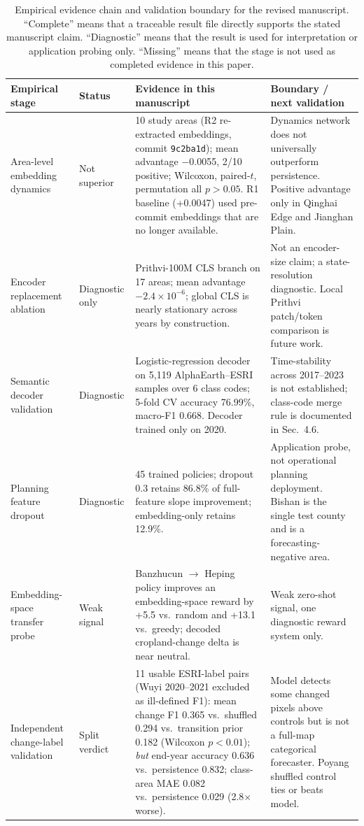 \documentclass{article}
\begin{document}
\begin{table}[htbp]
\centering
\caption{Empirical evidence chain and validation boundary for the revised manuscript. ``Complete'' means that a traceable result file directly supports the stated manuscript claim. ``Diagnostic'' means that the result is used for interpretation or application probing only. ``Missing'' means that the stage is not used as completed evidence in this paper.}
\label{tab:empirical_pipeline}
\footnotesize
\setlength{\tabcolsep}{2pt}
\begin{tabular}{@{}P{0.20\textwidth}P{0.11\textwidth}P{0.37\textwidth}P{0.26\textwidth}@{}}
\toprule
Empirical stage & Status & Evidence in this manuscript & Boundary / next validation \\
\midrule
Area-level embedding dynamics & Not superior & 10 study areas (R2 re-extracted embeddings, commit \texttt{9c2ba1d}); mean advantage $-$0.0055, 2/10 positive; Wilcoxon, paired-$t$, permutation all $p>0.05$. R1 baseline (+0.0047) used pre-commit embeddings that are no longer available. & Dynamics network does not universally outperform persistence. Positive advantage only in Qinghai Edge and Jianghan Plain. \\
Encoder replacement ablation & Diagnostic only & Prithvi-100M CLS branch on 17 areas; mean advantage $-2.4\times 10^{-6}$; global CLS is nearly stationary across years by construction. & Not an encoder-size claim; a state-resolution diagnostic. Local Prithvi patch/token comparison is future work. \\
Semantic decoder validation & Diagnostic & Logistic-regression decoder on 5,119 AlphaEarth--ESRI samples over 6 class codes; 5-fold CV accuracy 76.99\%, macro-F1 0.668. Decoder trained only on 2020. & Time-stability across 2017--2023 is not established; class-code merge rule is documented in Sec.~4.6. \\
Planning feature dropout & Diagnostic & 45 trained policies; dropout 0.3 retains 86.8\% of full-feature slope improvement; embedding-only retains 12.9\%. & Application probe, not operational planning deployment. Bishan is the single test county and is a forecasting-negative area. \\
Embedding-space transfer probe & Weak signal & Banzhucun $\to$ Heping policy improves an embedding-space reward by +5.5 vs.\ random and +13.1 vs.\ greedy; decoded cropland-change delta is near neutral. & Weak zero-shot signal, one diagnostic reward system only. \\
Independent change-label validation & Split verdict & 11 usable ESRI-label pairs (Wuyi 2020--2021 excluded as ill-defined F1): mean change F1 0.365 vs.\ shuffled 0.294 vs.\ transition prior 0.182 (Wilcoxon $p<0.01$); \emph{but} end-year accuracy 0.636 vs.\ persistence 0.832; class-area MAE 0.082 vs.\ persistence 0.029 (2.8$\times$ worse). & Model detects some changed pixels above controls but is not a full-map categorical forecaster. Poyang shuffled control ties or beats model. \\

\end{tabular}
\end{table}
\end{document}
